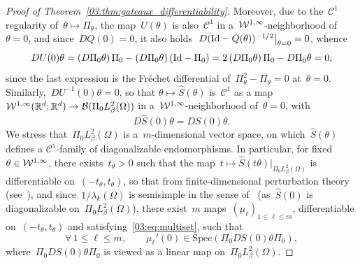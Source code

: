 \begin{proof}[Proof of Theorem~\ref{03:thm:gateaux_differentiability}]
    Moreover, due to the~$\mathcal C^1$ regularity of~$\theta\mapsto \Pi_\theta$, the map~$U(\theta)$ is also~$\mathcal C^1$ in a~${\mathcal{W}}^{1,\infty}$-neighborhood of~$\theta=0$, and since~$DQ(0)= 0$, it also holds~$\left.D(\mathrm{Id}-Q(\theta))^{-1/2}\right|_{\theta=0}=0$, whence
    \[D U(0)\theta = \left(D\Pi_0\theta\right)\Pi_0 - \left(D\Pi_0\theta\right)(\mathrm{Id} - \Pi_0) = 2\left(D\Pi_0\theta\right)\Pi_0 - D\Pi_0\theta = 0,\]
    since the last expression is the Fréchet differential of~$\Pi_\theta^2-\Pi_\theta=0$ at~$\theta=0$. Similarly,~$D U^{-1}(0)\theta=0$, so that
    $\theta\mapsto \widehat S(\theta)$ is~$\mathcal C^1$ as a map~${\mathcal{W}}^{1,\infty}(\mathbb{R}^d;\mathbb{R}^d)\to\mathcal B({\Pi_0 L^2_\beta(\Omega)})$ in a~${\mathcal{W}}^{1,\infty}$-neighborhood of~$\theta=0$, with
    \begin{equation}
        D\widehat{S}(0)\theta = D S(0)\theta.
    \end{equation}
    We stress that~$\Pi_0 L^2_\beta(\Omega)$ is a~$m$-dimensional vector space, on which~$\widehat S(\theta)$ defines a $\mathcal C^1$-family of diagonalizable endomorphisms.
    In particular, for fixed~$\theta\in {\mathcal{W}}^{1,\infty}$, there exists~$t_\theta>0$ such that the map~$t\mapsto \widehat S(t\theta)|_{{\Pi_0 L^2_\beta(\Omega)}}$ is differentiable on~$(-t_\theta,t_\theta)$, so that from finite-dimensional perturbation theory (see~\cite[Section II.5.4, Theorem 5.4 and Remark 5.5 and Section II.5.5, Theorem 5.6]{K95}), and since~$1/\lambda_k(\Omega)$ is semisimple in the sense of~\cite[Section I.4]{K95} (as~$\widehat S(0)$ is diagonalizable on~$\Pi_0 L_\beta^2(\Omega)$), there exist~$m$ maps~$\left(\mu_\ell\right)_{1\leq \ell\leq m}$, differentiable on~$(-t_\theta,t_\theta)$ and satisfying~\eqref{03:eq:multiset}, such that
    \begin{equation}
        \label{03:eq:gateaux_derivative_eigenvalue}
        \forall\,1\leq \ell\leq m,\qquad \mu_\ell'(0) \in \mathrm{Spec}\left(\Pi_0 D S(0) \theta \Pi_0\right),
    \end{equation}
    where~$\Pi_0 D S(0)\theta\Pi_0$ is viewed as a linear map on~${\Pi_0 L^2_\beta(\Omega)}$.

\end{proof}
